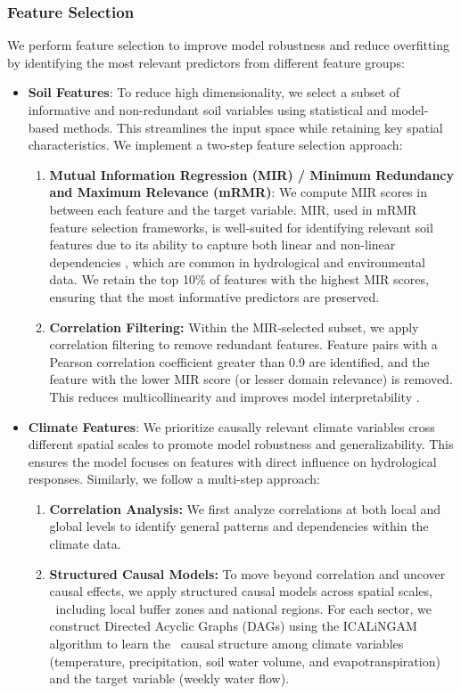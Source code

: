 \documentclass[ruler]{CUP-JNL-EDS}%
\begin{document}
\subsubsection{Feature Selection}
We perform feature selection to improve model robustness and reduce overfitting by identifying the most 
relevant predictors from different feature groups:
\begin{itemize}
    \item \textbf{Soil Features}: To reduce high dimensionality, we select a subset of informative and 
    non-redundant soil variables using statistical and model-based methods. This streamlines the 
    input space while retaining key spatial characteristics. We implement a two-step feature selection approach:
    \begin{enumerate}
        \item \textbf{Mutual Information Regression (MIR)  / Minimum Redundancy and Maximum Relevance (mRMR)}: We compute MIR scores in between each feature and the 
        target variable. MIR, used in mRMR feature selection frameworks, is well-suited for identifying relevant soil features due to its ability to capture both 
        linear and non-linear dependencies \citep{peng2005}, which are common in hydrological and environmental data. We retain 
        the top 10\% of features with the highest MIR scores, ensuring that the most informative predictors 
        are preserved.
        \vspace{5mm}
        \item \textbf{Correlation Filtering:} Within the MIR-selected subset, we apply correlation filtering to 
        remove redundant features. Feature pairs with a Pearson correlation coefficient greater than 0.9 are 
        identified, and the feature with the lower MIR score (or lesser domain relevance) is removed. This 
        reduces multicollinearity and improves model interpretability \citep{kuhnjohnson2019}.
    \end{enumerate}
    \item\textbf{Climate Features}: We prioritize causally relevant climate variables cross different spatial scales to promote model robustness 
    and generalizability. This ensures the model focuses on features with direct influence on hydrological responses. Similarly, we follow a 
    multi-step approach:
    \begin{enumerate}
        \item \textbf{Correlation Analysis:} We first analyze correlations at both local and global levels to identify 
        general patterns and dependencies within the climate data.
        \vspace{5mm}
        \item \textbf{Structured Causal Models:} To move beyond correlation and uncover causal effects, we apply structured causal models across spatial scales, \
        including local buffer zones and national regions. For each sector, we construct Directed Acyclic Graphs (DAGs) using the ICALiNGAM algorithm to learn the \ 
        causal structure among climate variables (temperature, precipitation, soil water volume, and evapotranspiration) and the target variable (weekly water flow).


\end{enumerate}
\end{itemize}
\end{document}
